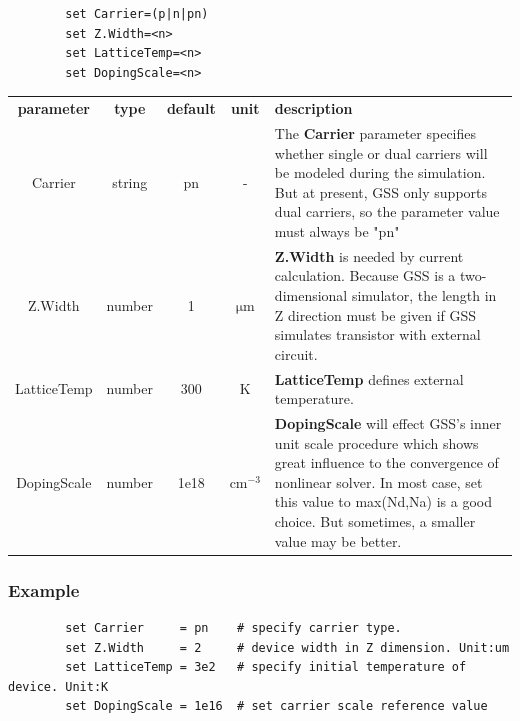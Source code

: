 \documentclass[11pt,pdftex]{article}
\begin{document}
\begin{verbatim}
        set Carrier=(p|n|pn)
        set Z.Width=<n>
        set LatticeTemp=<n>
        set DopingScale=<n>
\end{verbatim}

\small
\noindent\begin{longtable}{ccccp{7cm}}
\textbf{parameter}   & \textbf{type}          & \textbf{default} & \textbf{unit} & \textbf{description} \\
Carrier     & string  & pn   & -              & The \textbf{Carrier} parameter specifies whether single or dual
                                                carriers will be modeled during the simulation. But at present,
                                                GSS only supports dual carriers, so the parameter value must always be "pn" \\
Z.Width     & number  & 1    & $\mathrm{\mu m}$ & \textbf{Z.Width} is needed by current calculation. Because GSS
                                                is a two-dimensional simulator, the length in Z direction must be
                                                given if GSS simulates transistor with external circuit.  \\
LatticeTemp & number  & 300  & $\mathrm{K}$        & \textbf{LatticeTemp} defines external temperature.      \\
DopingScale & number  & 1e18 & $\mathrm{cm^{-3}}$  & \textbf{DopingScale} will effect GSS's inner unit scale procedure
                                                     which shows great influence to the convergence of nonlinear solver.
                                                     In most case, set this value to max(Nd,Na) is a good choice. But
                                                     sometimes, a smaller value may be better.\\
\end{longtable}
\normalsize

\subsubsection*{Example}
\begin{verbatim}
        set Carrier     = pn    # specify carrier type.
        set Z.Width     = 2     # device width in Z dimension. Unit:um
        set LatticeTemp = 3e2   # specify initial temperature of device. Unit:K
        set DopingScale = 1e16  # set carrier scale reference value
\end{verbatim}
\end{document}
